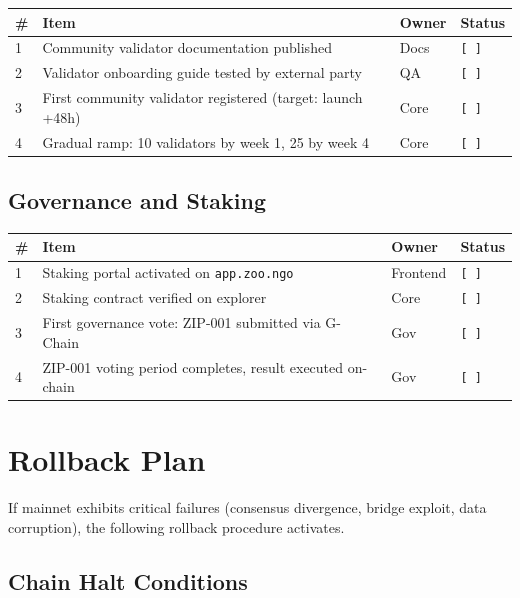 \documentclass[11pt,letterpaper]{article}
\newcommand{\pending}{\texttt{[ ]}}
\begin{document}
\begin{tabularx}{\textwidth}{@{}l X l l@{}}
\toprule
\textbf{\#} & \textbf{Item} & \textbf{Owner} & \textbf{Status} \\
\midrule
1 & Community validator documentation published                   & Docs   & \pending \\
2 & Validator onboarding guide tested by external party           & QA     & \pending \\
3 & First community validator registered (target: launch +48h)   & Core   & \pending \\
4 & Gradual ramp: 10 validators by week 1, 25 by week 4          & Core   & \pending \\
\bottomrule
\end{tabularx}

\subsection{Governance and Staking}

\begin{tabularx}{\textwidth}{@{}l X l l@{}}
\toprule
\textbf{\#} & \textbf{Item} & \textbf{Owner} & \textbf{Status} \\
\midrule
1 & Staking portal activated on \texttt{app.zoo.ngo}            & Frontend & \pending \\
2 & Staking contract verified on explorer                        & Core     & \pending \\
3 & First governance vote: ZIP-001 submitted via G-Chain         & Gov      & \pending \\
4 & ZIP-001 voting period completes, result executed on-chain    & Gov      & \pending \\
\bottomrule
\end{tabularx}

\section{Rollback Plan}

If mainnet exhibits critical failures (consensus divergence, bridge exploit,
data corruption), the following rollback procedure activates.

\subsection{Chain Halt Conditions}
\end{document}
